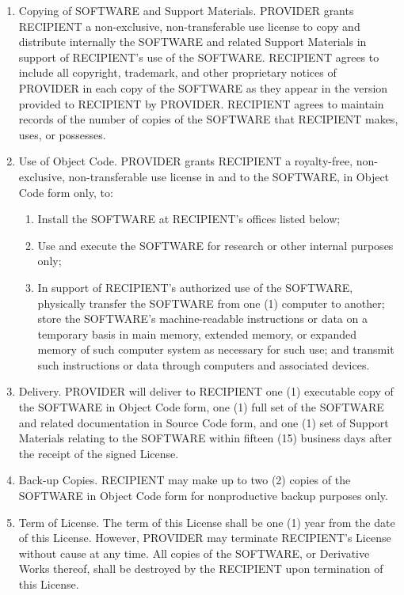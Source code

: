 \begin{enumerate}
\item Copying of SOFTWARE and Support Materials.  PROVIDER grants
RECIPIENT a non-exclusive, non-transferable use license to copy and
distribute internally the SOFTWARE and related Support Materials in
support of RECIPIENT's use of the SOFTWARE.  RECIPIENT agrees to
include all copyright, trademark, and other proprietary notices of
PROVIDER in each copy of the SOFTWARE as they appear in the version
provided to RECIPIENT by PROVIDER.  RECIPIENT agrees to maintain
records of the number of copies of the SOFTWARE that RECIPIENT makes,
uses, or possesses. 

\item Use of Object Code.  PROVIDER grants RECIPIENT a royalty-free,
non-exclusive, non-transferable use license in and to the SOFTWARE, in
Object Code form only, to: 
  \begin{enumerate}
  \item Install the SOFTWARE at RECIPIENT's offices listed below;
  \item Use and execute the SOFTWARE for research or other internal
  purposes only;
  \item In support of RECIPIENT's authorized use of the SOFTWARE,
  physically transfer the SOFTWARE from one (1) computer to another;
  store the SOFTWARE's machine-readable instructions or data on a
  temporary basis in main memory, extended memory, or expanded memory
  of such computer system as necessary for such use; and transmit such
  instructions or data through computers and associated devices.
  \end{enumerate}

\item Delivery.  PROVIDER will deliver to RECIPIENT one (1) executable
copy of the SOFTWARE in Object Code form, one (1) full set of the
SOFTWARE and related documentation in Source Code form, and one (1)
set of Support Materials relating to the SOFTWARE within fifteen (15)
business days after the receipt of the signed License. 

\item Back-up Copies.  RECIPIENT may make up to two (2) copies of the
SOFTWARE in Object Code form for nonproductive backup purposes only. 

\item Term of License.  The term of this License shall be one (1) year
from the date of this License.  However, PROVIDER may terminate
RECIPIENT's License without cause at any time.  All copies of the
SOFTWARE, or Derivative Works thereof, shall be destroyed by the
RECIPIENT upon termination of this License.   


\end{enumerate}
